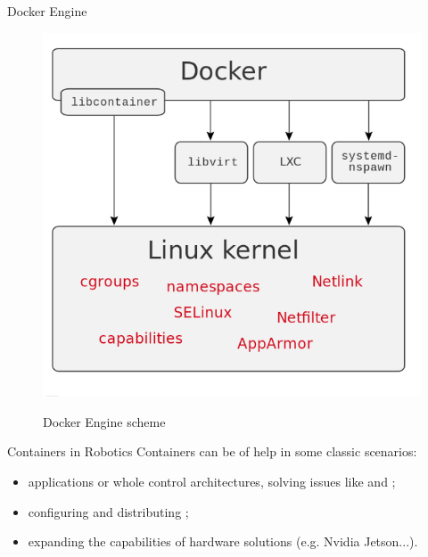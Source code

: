 \begin{frame}{Docker Engine}
\begin{figure}
  \centering
  \includegraphics[scale=.3]{dockerScheme.png}
  \label{fig:dockerscheme}
  \caption{Docker Engine scheme}
\end{figure}
\end{frame}

\begin{frame}{Containers in Robotics}
Containers can be of help in some classic scenarios:
\begin{itemize}
  \item {} applications or whole control architectures, solving issues like  and ;
  \item configuring and distributing ;
  \item expanding the capabilities of  hardware solutions (e.g. Nvidia Jetson...).
\end{itemize}
\end{frame}
